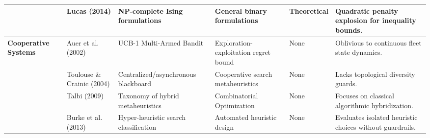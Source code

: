 \begin{table}[t]
\begin{tabular}{lp{3.5cm}p{2.8cm}p{3.2cm}p{2.2cm}p{2.8cm}}
& Lucas (2014) \cite{lucas2014ising} & NP-complete Ising formulations & General binary formulations & Theoretical & Quadratic penalty explosion for inequality bounds. \\
\midrule
\multirow{4}{*}{\textbf{Cooperative Systems}}
& Auer et al. (2002) \cite{auer2002finite} & UCB-1 Multi-Armed Bandit & Exploration-exploitation regret bound & None & Oblivious to continuous fleet state dynamics. \\
& Toulouse \& Crainic (2004) \cite{toulouse2004cooperative} & Centralized/asynchronous blackboard & Cooperative search metaheuristics & None & Lacks topological diversity guards. \\
& Talbi (2009) \cite{talbi2009metaheuristics} & Taxonomy of hybrid metaheuristics & Combinatorial Optimization & None & Focuses on classical algorithmic hybridization. \\
& Burke et al. (2013) \cite{burke2013hyper} & Hyper-heuristic search classification & Automated heuristic design & None & Evaluates isolated heuristic choices without guardrails. \\
\bottomrule
\end{tabular}
\end{table}
